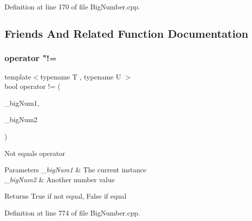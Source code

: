Definition at line 170 of file Big\+Number.\+cpp.



\subsection{Friends And Related Function Documentation}
\mbox{\label{class_big_nums_1_1_big_number_a7311ab2265ec5536725ffdc2dcfb7dcb}} 
\subsubsection{\texorpdfstring{operator "!=}{operator !=}\hspace{0.1cm}{\footnotesize\ttfamily [1/2]}}
{\footnotesize\ttfamily template$<$typename T , typename U $>$ \\
bool operator != (\begin{DoxyParamCaption}\item[{const \mbox{\hyperlink{class_big_nums_1_1_big_number}{Big\+Number}} \&}]{\+\_\+big\+Num1,  }\item[{const \mbox{\hyperlink{class_big_nums_1_1_big_number}{Big\+Number}} \&}]{\+\_\+big\+Num2 }\end{DoxyParamCaption})\hspace{0.3cm}{\ttfamily [friend]}}

Not equals operator 
\begin{DoxyParams}{Parameters}
{\em \+\_\+big\+Num1} & The current instance \\
\hline
{\em \+\_\+big\+Num2} & Another number value \\
\hline
\end{DoxyParams}
\begin{DoxyReturn}{Returns}
True if not equal, False if equal 
\end{DoxyReturn}


Definition at line 774 of file Big\+Number.\+cpp.

\mbox{\label{class_big_nums_1_1_big_number_a06943b4fe9e60b40857108c3d1a40c4b}} 
